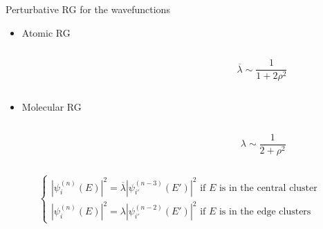 \documentclass[xcolor=x11names,compress,professionalfonts]{beamer}
\renewcommand{\(}{\begin{columns}}
\renewcommand{\)}{\end{columns}}
\newcommand{\<}[1]{\begin{column}{#1}}
\renewcommand{\>}{\end{column}}
\newcommand{\lb}{\ensuremath{\overline{\lambda}}}
\begin{document}
\begin{frame}{Perturbative RG for the wavefunctions}
	\begin{itemize}

		\item Atomic RG
			\begin{columns}
			\begin{column}{9cm}
				
			\end{column}
			\begin{column}{2cm}
			\[ \lb \sim \frac{1}{1+2\rho^2}
			\]
			\end{column}
			\end{columns}
		\item Molecular RG
			\begin{columns}
			\begin{column}{9cm}
				
			\end{column}
			\begin{column}{2cm}
			\[ \lambda \sim \frac{1}{2+\rho^2}
			\]
			\end{column}
			\end{columns}
	\end{itemize}

\[
	\begin{cases}
		|\psi_i^{(n)}(E)|^2 = \lb |\psi_{i'}^{(n-3)}(E')|^2 \text{~if $E$ is in the central cluster}\\
		|\psi_i^{(n)}(E)|^2 = \lambda |\psi_{i'}^{(n-2)}(E')|^2 \text{~if }E\text{~is in the edge clusters}
	\end{cases}
	\]
\end{frame}
\end{document}

